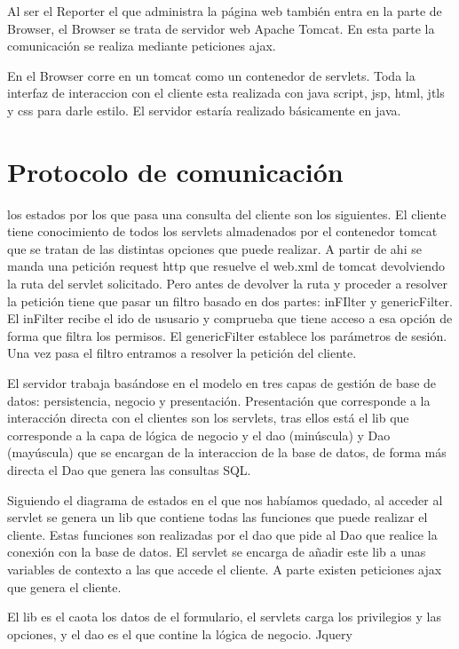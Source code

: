 Al ser el Reporter el que administra la página web también entra en la parte de Browser,
 el Browser se trata de servidor web Apache Tomcat. En esta parte la comunicación se 
realiza mediante peticiones ajax.

En el Browser corre en un tomcat como un contenedor de servlets. Toda la interfaz de 
interaccion con el cliente esta realizada con java script, jsp, html, jtls y css para darle estilo.
 El servidor estaría realizado básicamente en java.

\section*{Protocolo de comunicación}

los estados por los que pasa una consulta del cliente son los siguientes. El cliente tiene 
conocimiento de todos los servlets almadenados por el contenedor tomcat que se tratan 
de las distintas opciones que puede realizar. A partir de ahi se manda una petición
 request http que resuelve el web.xml de tomcat devolviendo la ruta del servlet solicitado.
 Pero antes de devolver la ruta y proceder a resolver la petición tiene que pasar un filtro
 basado en dos partes: inFIlter y genericFilter. El inFilter recibe el ido de ususario y comprueba
 que tiene acceso a esa opción de forma que filtra los permisos. El genericFilter establece 
los parámetros de sesión. Una vez pasa el filtro entramos a resolver la petición del cliente.

El servidor trabaja basándose en el modelo en tres capas de gestión de base de datos: 
persistencia, negocio y presentación. Presentación que corresponde a la interacción directa
 con el clientes son los servlets, tras ellos está el lib que corresponde a la capa de lógica
 de negocio y el dao (minúscula) y Dao (mayúscula) que se encargan de la interaccion de
 la base de datos, de forma más directa el Dao que genera las consultas SQL.

Siguiendo el diagrama de estados en el que nos habíamos quedado, al acceder al servlet se
 genera un lib que contiene todas las funciones que puede realizar el cliente. Estas funciones 
son realizadas por el dao que pide al Dao que realice la conexión con la base de datos. 
El servlet se encarga de añadir este lib a unas variables de contexto a las que accede el cliente.
 A parte existen peticiones ajax que genera el cliente.

El lib es el caota los datos de el formulario, el servlets carga los privilegios y las opciones, 
y el dao es el que contine la lógica de negocio. Jquery

